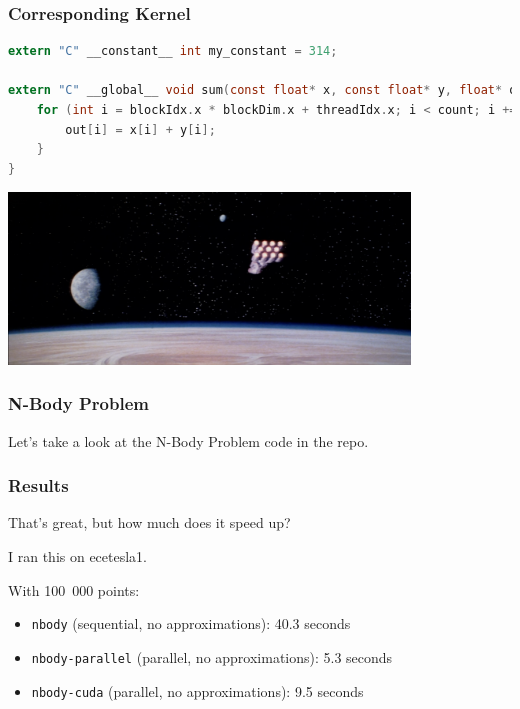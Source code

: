 \begin{frame}[fragile]
\frametitle{Corresponding Kernel}

\begin{lstlisting}[language=C]
extern "C" __constant__ int my_constant = 314;

extern "C" __global__ void sum(const float* x, const float* y, float* out, int count) {
    for (int i = blockIdx.x * blockDim.x + threadIdx.x; i < count; i += blockDim.x * gridDim.x) {
        out[i] = x[i] + y[i];
    }
}
\end{lstlisting}


\begin{center}
	\includegraphics[width=0.8\textwidth]{images/tantive-iv.png}
\end{center}
\end{frame}

\begin{frame}[fragile]
\frametitle{N-Body Problem}

Let's take a look at the N-Body Problem code in the repo.

\end{frame}


\begin{frame}
\frametitle{Results}

That's great, but how much does it speed up? 

I ran this on ecetesla1.

With 100~000 points:
\begin{itemize}
	\item \texttt{nbody} (sequential, no approximations): 40.3 seconds
	\item \texttt{nbody-parallel} (parallel, no approximations): 5.3 seconds
	\item \texttt{nbody-cuda} (parallel, no approximations): 9.5 seconds
\end{itemize}

\end{frame}


